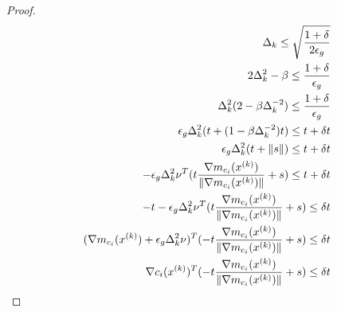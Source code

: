 \begin{proof}
\begin{align*}
\Delta_k \le \sqrt{\frac {1 + \delta} {2\epsilon_{g}}} \\
2\Delta_k^2 - \beta \le \frac{1 + \delta}{\epsilon_{g}} \\
\Delta_k^2(2 - \beta\Delta_k^{-2}) \le \frac{1 + \delta}{\epsilon_{g}} \\
\epsilon_{g}\Delta_k^2(t +  (1 - \beta\Delta_k^{-2})t) \le t + \delta t \\
\epsilon_{g}\Delta_k^2(t + \|s\|) \le t + \delta t\\
- \epsilon_{g}\Delta_k^2\nu^T(t\frac{\nabla m_{c_i}({x^{(k)}})}{\|\nabla m_{c_i}({x^{(k)}})\|} + s) \le t + \delta t \\
-t - \epsilon_{g}\Delta_k^2\nu^T(t\frac{\nabla m_{c_i}({x^{(k)}})}{\|\nabla m_{c_i}({x^{(k)}})\|} + s) \le \delta t \\
(\nabla m_{c_i}({x^{(k)}}) + \epsilon_{g}\Delta_k^2\nu)^T(- t\frac{\nabla m_{c_i}({x^{(k)}})}{\|\nabla m_{c_i}({x^{(k)}})\|} + s) \le \delta t \\
\nabla c_i({x^{(k)}})^T(- t\frac{\nabla m_{c_i}({x^{(k)}})}{\|\nabla m_{c_i}({x^{(k)}})\|} + s) \le \delta t \\
\end{align*}




\end{proof}
